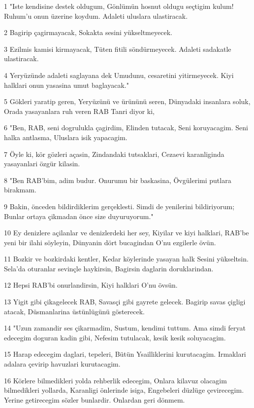\par 1 "Iste kendisine destek oldugum, Gönlümün hosnut oldugu seçtigim kulum! Ruhum'u onun üzerine koydum. Adaleti uluslara ulastiracak.
\par 2 Bagirip çagirmayacak, Sokakta sesini yükseltmeyecek.
\par 3 Ezilmis kamisi kirmayacak, Tüten fitili söndürmeyecek. Adaleti sadakatle ulastiracak.
\par 4 Yeryüzünde adaleti saglayana dek Umudunu, cesaretini yitirmeyecek. Kiyi halklari onun yasasina umut baglayacak."
\par 5 Gökleri yaratip geren, Yeryüzünü ve ürününü seren, Dünyadaki insanlara soluk, Orada yasayanlara ruh veren RAB Tanri diyor ki,
\par 6 "Ben, RAB, seni dogrulukla çagirdim, Elinden tutacak, Seni koruyacagim. Seni halka antlasma, Uluslara isik yapacagim.
\par 7 Öyle ki, kör gözleri açasin, Zindandaki tutsaklari, Cezaevi karanliginda yasayanlari özgür kilasin.
\par 8 "Ben RAB'bim, adim budur. Onurumu bir baskasina, Övgülerimi putlara birakmam.
\par 9 Bakin, önceden bildirdiklerim gerçeklesti. Simdi de yenilerini bildiriyorum; Bunlar ortaya çikmadan önce size duyuruyorum."
\par 10 Ey denizlere açilanlar ve denizlerdeki her sey, Kiyilar ve kiyi halklari, RAB'be yeni bir ilahi söyleyin, Dünyanin dört bucagindan O'nu ezgilerle övün.
\par 11 Bozkir ve bozkirdaki kentler, Kedar köylerinde yasayan halk Sesini yükseltsin. Sela'da oturanlar sevinçle haykirsin, Bagirsin daglarin doruklarindan.
\par 12 Hepsi RAB'bi onurlandirsin, Kiyi halklari O'nu övsün.
\par 13 Yigit gibi çikagelecek RAB, Savasçi gibi gayrete gelecek. Bagirip savas çigligi atacak, Düsmanlarina üstünlügünü gösterecek.
\par 14 "Uzun zamandir ses çikarmadim, Sustum, kendimi tuttum. Ama simdi feryat edecegim doguran kadin gibi, Nefesim tutulacak, kesik kesik soluyacagim.
\par 15 Harap edecegim daglari, tepeleri, Bütün Ysailliklerini kurutacagim. Irmaklari adalara çevirip havuzlari kurutacagim.
\par 16 Körlere bilmedikleri yolda rehberlik edecegim, Onlara kilavuz olacagim bilmedikleri yollarda, Karanligi önlerinde isiga, Engebeleri düzlüge çevirecegim. Yerine getirecegim sözler bunlardir. Onlardan geri dönmem.
